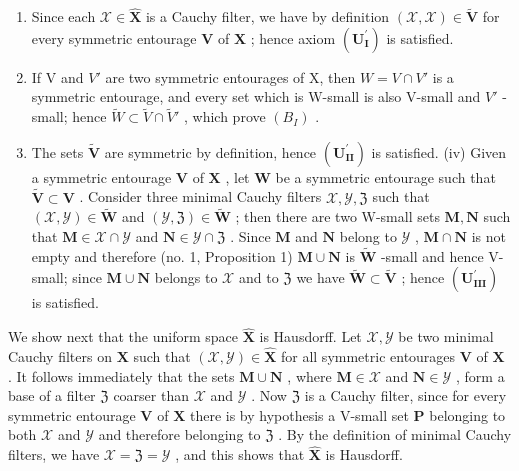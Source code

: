 \begin{enumerate}
\def\labelenumi{(\roman{enumi})}
\item
  Since each \(\mathcal{X} \in \hat{\mathbf{X}}\) is a Cauchy filter, we have by definition \((\mathcal{X}, \mathcal{X}) \in \tilde{\mathbf{V}}\) for every symmetric entourage \(\mathbf{V}\) of \(\mathbf{X}\) ; hence axiom \((\mathbf{U}_{\mathbf{I}}^{\prime})\) is satisfied.
\item
  If V and \(V'\) are two symmetric entourages of X, then \(W = V \cap V'\) is a symmetric entourage, and every set which is W-small is also V-small and \(V'\) -small; hence \(\tilde{W} \subset \tilde{V} \cap \tilde{V}'\) , which prove \((B_{I})\) .
\item
  The sets \(\tilde{\mathbf{V}}\) are symmetric by definition, hence \((\mathbf{U}_{\mathbf{II}}^{\prime})\) is satisfied. (iv) Given a symmetric entourage \(\mathbf{V}\) of \(\mathbf{X}\) , let \(\mathbf{W}\) be a symmetric entourage such that \(\tilde{\mathbf{V}} \subset \mathbf{V}\) . Consider three minimal Cauchy filters \(\mathcal{X}, \mathcal{Y}, \mathfrak{Z}\) such that \((\mathcal{X}, \mathcal{Y}) \in \tilde{\mathbf{W}}\) and \((\mathcal{Y}, \mathfrak{Z}) \in \tilde{\mathbf{W}}\) ; then there are two W-small sets \(\mathbf{M}, \mathbf{N}\) such that \(\mathbf{M} \in \mathcal{X} \cap \mathcal{Y}\) and \(\mathbf{N} \in \mathcal{Y} \cap \mathfrak{Z}\) . Since \(\mathbf{M}\) and \(\mathbf{N}\) belong to \(\mathcal{Y}\) , \(\mathbf{M} \cap \mathbf{N}\) is not empty and therefore (no. 1, Proposition 1) \(\mathbf{M} \cup \mathbf{N}\) is \(\tilde{\mathbf{W}}\) -small and hence V-small; since \(\mathbf{M} \cup \mathbf{N}\) belongs to \(\mathcal{X}\) and to \(\mathfrak{Z}\) we have \(\tilde{\mathbf{W}} \subset \tilde{\mathbf{V}}\) ; hence \((\mathbf{U}_{\mathbf{III}}^{\prime})\) is satisfied.
\end{enumerate}

We show next that the uniform space \(\hat{\mathbf{X}}\) is Hausdorff. Let \(\mathcal{X},\mathcal{Y}\) be two minimal Cauchy filters on \(\mathbf{X}\) such that \((\mathcal{X},\mathcal{Y})\in \hat{\mathbf{X}}\) for all symmetric entourages \(\mathbf{V}\) of \(\mathbf{X}\) . It follows immediately that the sets \(\mathbf{M}\cup \mathbf{N}\) , where \(\mathbf{M}\in \mathcal{X}\) and \(\mathbf{N}\in \mathcal{Y}\) , form a base of a filter \(\mathfrak{Z}\) coarser than \(\mathcal{X}\) and \(\mathcal{Y}\) . Now \(\mathfrak{Z}\) is a Cauchy filter, since for every symmetric entourage \(\mathbf{V}\) of \(\mathbf{X}\) there is by hypothesis a V-small set \(\mathbf{P}\) belonging to both \(\mathcal{X}\) and \(\mathcal{Y}\) and therefore belonging to \(\mathfrak{Z}\) . By the definition of minimal Cauchy filters, we have \(\mathcal{X} = \mathfrak{Z} = \mathcal{Y}\) , and this shows that \(\hat{\mathbf{X}}\) is Hausdorff.

